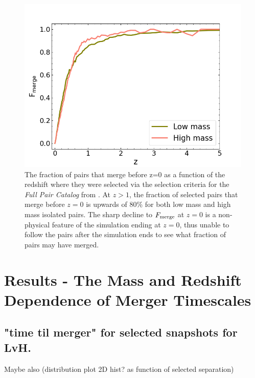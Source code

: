 \documentclass[twocolumn]{aastex631}
\newcommand{\paircat}{\textit{Full Pair Catalog}}
\begin{document}
\begin{figure}[htb]
    \begin{center}
    \includegraphics[width=\columnwidth]{plots/bet-on-it/1_fmerge_comp.png}
    \caption{The fraction of pairs that merge before z=0 as a function of the redshift where they were selected via the selection criteria for the \paircat{} from \citet{Chamberlain2024}. At $z>1$, the fraction of selected pairs that merge before $z=0$ is upwards of 80\% for both low mass and high mass isolated pairs. The sharp decline to $F_{\rm merge}$ at $z=0$ is a non-physical feature of the simulation ending at $z=0$, thus unable to follow the pairs after the simulation ends to see what fraction of pairs may have merged.}
    \label{fig:fmerge}
    \end{center}
\end{figure}



\section{Results - The Mass and Redshift Dependence of Merger Timescales}
\subsection{"time til merger" for selected snapshots for LvH.}
Maybe also (distribution plot 2D hist? as function of selected separation)
\end{document}

